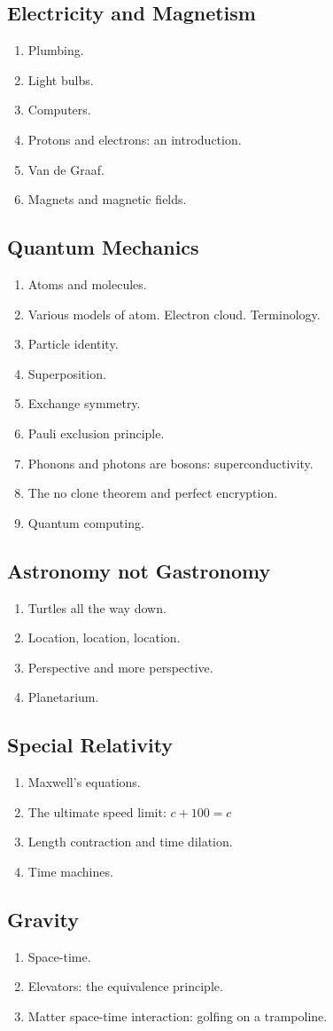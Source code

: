\documentclass[11pt,article,oneside]{memoir}
\begin{document}
\subsection*{Electricity and Magnetism}
\begin{enumerate}
\item Plumbing.
\item Light bulbs.
\item Computers.
\item Protons and electrons: an introduction.
\item Van de Graaf.
\item Magnets and magnetic fields.
\end{enumerate}
\subsection*{Quantum Mechanics}
\begin{enumerate}
\item Atoms and molecules.
\item Various models of atom. Electron cloud. Terminology.
\item Particle identity.
\item Superposition.
\item Exchange symmetry.
\item Pauli exclusion principle.
\item Phonons and photons are bosons: superconductivity.
\item The no clone theorem and perfect encryption.
\item Quantum computing.
\end{enumerate}
\subsection*{Astronomy not Gastronomy}
\begin{enumerate}
\item Turtles all the way down.
\item Location, location, location.
\item Perspective and more perspective.
\item Planetarium.
\end{enumerate}
\subsection*{Special Relativity}
\begin{enumerate}
\item Maxwell's equations.
\item The ultimate speed limit: $c + 100 = c$
\item Length contraction and time dilation.
\item Time machines.
\end{enumerate}
\subsection*{Gravity}
\begin{enumerate}
\item Space-time.
\item Elevators: the equivalence principle.
\item Matter space-time interaction: golfing on a trampoline.
\end{enumerate}
\end{document}
